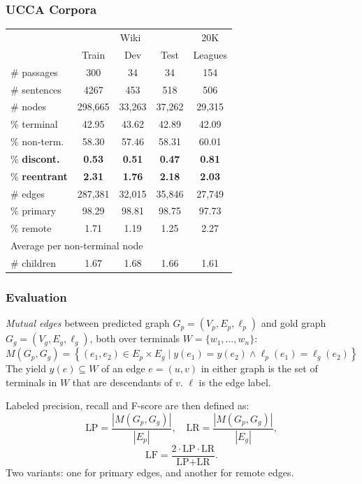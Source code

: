 \documentclass[t]{beamer}
\begin{document}
\begin{frame}
\frametitle{UCCA Corpora}
\centering
\begin{tabular}{l|ccc|c}
& \multicolumn{3}{c|}{Wiki} & 20K \\
& \small Train & \small Dev & \small Test & Leagues \\
\hline
\# passages & 300 & 34 & 34 & 154 \\
\# sentences & 4267 & 453 & 518 & 506 \\
\hline
\# nodes & 298,665 & 33,263 & 37,262 & 29,315 \\
\% terminal & 42.95 & 43.62 & 42.89 & 42.09 \\
\% non-term. & 58.30 & 57.46 & 58.31 & 60.01 \\
\% \bf discont. & \bf 0.53 & \bf 0.51 & \bf 0.47 & \bf 0.81 \\
\% \bf reentrant & \bf 2.31 & \bf 1.76 & \bf 2.18 & \bf 2.03 \\
\hline
\# edges & 287,381 & 32,015 & 35,846 & 27,749 \\
\% primary & 98.29 & 98.81 & 98.75 & 97.73 \\
\% remote & 1.71 & 1.19 & 1.25 & 2.27 \\
\hline
\multicolumn{3}{l}{\footnotesize Average per non-terminal node} \\
\# children & 1.67 & 1.68 & 1.66 & 1.61 
\end{tabular}
\end{frame}

\begin{frame}
\frametitle{Evaluation}
\textit{Mutual edges} between predicted graph $G_p=(V_p,E_p,\ell_p)$
and gold graph $G_g=(V_g,E_g,\ell_g)$,
both over terminals $W = \{w_1,\ldots,w_n\}$:
\[
M(G_p,G_g) =
    \left\{(e_1,e_2) \in E_p \times E_g \;|\;
    y(e_1) = y(e_2) \wedge \ell_p(e_1)=\ell_g(e_2)\right\}
\]
The yield $y(e) \subseteq W$ of an edge $e=(u,v)$ in either graph
is the set of terminals in $W$ that are descendants of $v$. \hfill
$\ell$ is the edge label.

\vfill
\pause
Labeled precision, recall and F-score are then defined as:
\[
\text{LP} = \frac{|M(G_p,G_g)|}{|E_p|},\quad
\text{LR} = \frac{|M(G_p,G_g)|}{|E_g|},
\]
\[
\text{LF} = \frac{2 \cdot \text{LP} \cdot \text{LR}}{\text{LP} + \text{LR}}.
\]
Two variants:
one for primary edges, and another for remote edges.
\end{frame}
\end{document}
